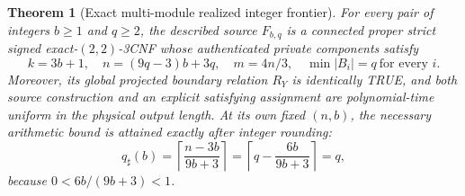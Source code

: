 \documentclass[10.5pt]{article}
\newtheorem{theorem}{Theorem}
\begin{document}
\begin{theorem}[Exact multi-module realized integer frontier]\label{th:main}
For every pair of integers $b\ge1$ and $q\ge2$, the described source $F_{b,q}$ is a connected proper strict signed exact-$(2,2)$-3CNF whose authenticated private components satisfy
\begin{equation}\label{eq:counts}
\boxed{k=3b+1,\quad n=(9q-3)b+3q,\quad m=4n/3,\quad \min|B_i|=q\ \text{for every }i.}
\end{equation}
Moreover, its global projected boundary relation $R_Y$ is identically TRUE, and both source construction and an explicit satisfying assignment are polynomial-time uniform in the physical output length. At its own fixed $(n,b)$, the necessary arithmetic bound is attained \emph{exactly after integer rounding}: 
\[
 q_{\sharp}(b)=\left\lceil\frac{n-3b}{9b+3}\right\rceil
 =\left\lceil q-\frac{6b}{9b+3}\right\rceil=q,
\]
because $0<6b/(9b+3)<1$.
\end{theorem}
\end{document}
